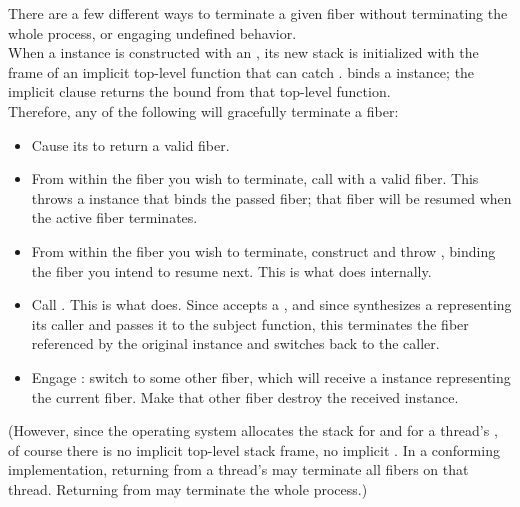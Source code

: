 
There are a few different ways to terminate a given fiber without
terminating the whole process, or engaging undefined behavior.\\

When a \fiber instance is constructed with an \entryfn, its new stack is
initialized with the frame of an implicit top-level function that can
catch \unwindex. \unwindex binds a \fiber instance; the implicit 
clause returns the bound \fiber from that top-level function.\\

Therefore, any of the following will gracefully terminate a fiber:

\begin{itemize}
    \item Cause its \entryfn to return a valid fiber.
    \item From within the fiber you wish to terminate, call \unwindfib with a
          valid fiber. This throws a \unwindex instance that binds the passed
          fiber; that fiber will be resumed when the active fiber terminates.
    \item From within the fiber you wish to terminate, construct and
          throw \unwindex, binding the fiber you intend to resume next. This
          is what \unwindfib does internally.
    \item Call . This is what \dtor
          does. Since \unwindfib accepts a \fiber, and since \resumewith
          synthesizes a \fiber representing its caller and passes it to the
          subject function, this terminates the fiber referenced by the
          original \fiber instance and switches back to the caller.
    \item Engage \dtor: switch to some other fiber, which will
          receive a \fiber instance representing the current fiber. Make that
          other fiber destroy the received \fiber instance.
\end{itemize}

(However, since the operating system allocates the stack for \main and for a
thread's \entryfn, of course there is no implicit top-level stack frame, no
implicit . In a conforming implementation,
returning from a thread's \entryfn\xspace may terminate all fibers on that
thread. Returning from \main may terminate the whole process.)\\

